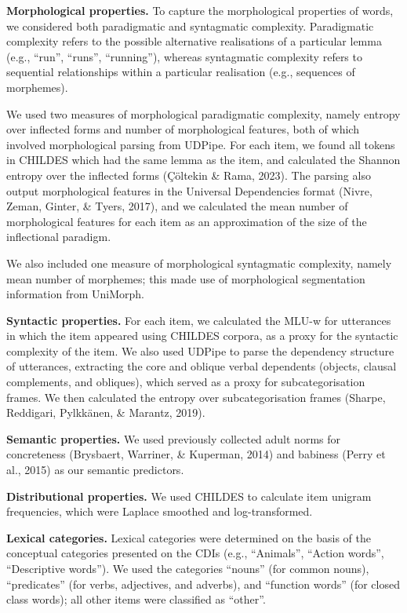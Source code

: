\documentclass[10pt, letterpaper]{article}
\begin{document}
\textbf{Morphological properties.} To capture the morphological
properties of words, we considered both paradigmatic and syntagmatic
complexity. Paradigmatic complexity refers to the possible alternative
realisations of a particular lemma (e.g., ``run'', ``runs'',
``running''), whereas syntagmatic complexity refers to sequential
relationships within a particular realisation (e.g., sequences of
morphemes).

We used two measures of morphological paradigmatic complexity, namely
entropy over inflected forms and number of morphological features, both
of which involved morphological parsing from UDPipe. For each item, we
found all tokens in CHILDES which had the same lemma as the item, and
calculated the Shannon entropy over the inflected forms (Çöltekin \&
Rama, 2023). The parsing also output morphological features in the
Universal Dependencies format (Nivre, Zeman, Ginter, \& Tyers, 2017),
and we calculated the mean number of morphological features for each
item as an approximation of the size of the inflectional paradigm.

We also included one measure of morphological syntagmatic complexity,
namely mean number of morphemes; this made use of morphological
segmentation information from UniMorph.

\textbf{Syntactic properties.} For each item, we calculated the MLU-w
for utterances in which the item appeared using CHILDES corpora, as a
proxy for the syntactic complexity of the item. We also used UDPipe to
parse the dependency structure of utterances, extracting the core and
oblique verbal dependents (objects, clausal complements, and obliques),
which served as a proxy for subcategorisation frames. We then calculated
the entropy over subcategorisation frames (Sharpe, Reddigari, Pylkkänen,
\& Marantz, 2019).

\textbf{Semantic properties.} We used previously collected adult norms
for concreteness (Brysbaert, Warriner, \& Kuperman, 2014) and babiness
(Perry et al., 2015) as our semantic predictors.

\textbf{Distributional properties.} We used CHILDES to calculate item
unigram frequencies, which were Laplace smoothed and log-transformed.

\textbf{Lexical categories.} Lexical categories were determined on the
basis of the conceptual categories presented on the CDIs (e.g.,
``Animals'', ``Action words'', ``Descriptive words''). We used the
categories ``nouns'' (for common nouns), ``predicates'' (for verbs,
adjectives, and adverbs), and ``function words'' (for closed class
words); all other items were classified as ``other''.
\end{document}
